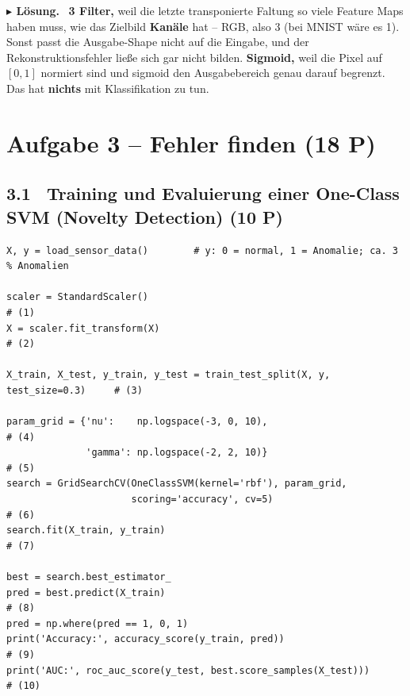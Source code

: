 \documentclass[10pt,a4paper]{article}
\newcommand{\pkt}[1]{\hfill\textbf{(#1 P)}}
\newenvironment{loes}%
  {\par\vspace{2pt}\begingroup\small\noindent\textbf{\color{loesfarbe}$\blacktriangleright$ Lösung.}\ }%
  {\endgroup\par\vspace{5pt}}
\begin{document}
\begin{loes}
\textbf{3 Filter,} weil die letzte transponierte Faltung so viele Feature Maps haben muss, wie das
Zielbild \textbf{Kanäle} hat -- RGB, also 3 (bei MNIST wäre es 1). Sonst passt die Ausgabe-Shape
nicht auf die Eingabe, und der Rekonstruktionsfehler ließe sich gar nicht bilden.
\textbf{Sigmoid,} weil die Pixel auf $[0,1]$ normiert sind und sigmoid den Ausgabebereich genau
darauf begrenzt. Das hat \textbf{nichts} mit Klassifikation zu tun.
\end{loes}

\newpage
\section*{Aufgabe 3 -- Fehler finden \pkt{18}}

\subsection*{3.1 \ Training und Evaluierung einer One-Class SVM (Novelty Detection) \pkt{10}}

\begin{lstlisting}
X, y = load_sensor_data()        # y: 0 = normal, 1 = Anomalie; ca. 3 % Anomalien

scaler = StandardScaler()                                                    # (1)
X = scaler.fit_transform(X)                                                  # (2)

X_train, X_test, y_train, y_test = train_test_split(X, y, test_size=0.3)     # (3)

param_grid = {'nu':    np.logspace(-3, 0, 10),                               # (4)
              'gamma': np.logspace(-2, 2, 10)}                               # (5)
search = GridSearchCV(OneClassSVM(kernel='rbf'), param_grid,
                      scoring='accuracy', cv=5)                              # (6)
search.fit(X_train, y_train)                                                 # (7)

best = search.best_estimator_
pred = best.predict(X_train)                                                 # (8)
pred = np.where(pred == 1, 0, 1)
print('Accuracy:', accuracy_score(y_train, pred))                            # (9)
print('AUC:', roc_auc_score(y_test, best.score_samples(X_test)))             # (10)
\end{lstlisting}
\end{document}
